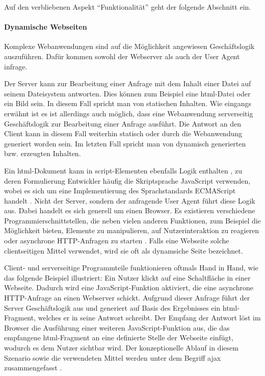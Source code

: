         Auf den verbliebenen Aspekt "`Funktionalität"' geht der folgende Abschnitt ein.

        \paragraph*{Dynamische Webseiten}
        Komplexe Webanwendungen sind auf die Möglichkeit angewiesen Geschäftslogik auszuführen.
        Dafür kommen sowohl der Webserver als auch der User Agent infrage.

        Der Server kann zur Bearbeitung einer Anfrage mit dem Inhalt einer Datei auf seinem Dateisystem antworten.
        Dies können zum Beispiel eine \gls{html}-Datei oder ein Bild sein.
        In diesem Fall spricht man von statischen Inhalten.
        Wie eingangs erwähnt ist es ist allerdings auch möglich,
        dass eine Webanwendung serverseitig Geschäftslogik zur Bearbeitung einer Anfrage ausführt.
        Die Antwort an den Client kann in diesem Fall weiterhin statisch oder
        durch die Webanwendung generiert worden sein.
        Im letzten Fall spricht man von dynamisch generierten bzw. erzeugten Inhalten.

        Ein \gls{html}-Dokument kann in script-Elementen ebenfalls Logik enthalten
        \cite[Kapitel 4.11]{w3c:html5},
        zu deren Formulierung Entwickler häufig die Skriptsprache JavaScript verwenden,
        wobei es sich um eine Implementierung des Sprachstandards ECMAScript handelt
        \cite{ecma:ecmaScript}.
        Nicht der Server, sondern der anfragende User Agent führt diese Logik aus.
        Dabei handelt es sich generell um einen Browser.
        Es existieren verschiedene Programmierschnittstellen,
        die neben vielen anderen Funktionen, zum Beispiel die Möglichkeit bieten,
        Elemente zu manipulieren, auf Nutzerinteraktion zu reagieren
        oder asynchrone HTTP-Anfragen zu starten \cite[Kapitel 8]{whatwg:html}\cite{whatwg:xhr}.
        Falls eine Webseite solche clientseitigen Mittel verwendet,
        wird sie oft als dynamsiche Seite bezeichnet.
        
        Client- und serverseitige Programmteile funktionieren oftmals Hand in Hand,
        wie das folgende Beispiel illustriert:
        Ein Nutzer klickt auf eine Schaltfläche in einer Webseite.
        Dadurch wird eine JavaScript-Funktion aktiviert,
        die eine asynchrone HTTP-Anfrage an einen Webserver schickt.
        Aufgrund dieser Anfrage führt der Server Geschäftslogik aus
        und generiert auf Basis des Ergebnisses ein \gls{html}-Fragment,
        welches er in seine Antwort schreibt.
        Der Empfang der Antwort löst im Browser die Ausführung einer weiteren
        JavaScript-Funktion aus, die das empfangene \gls{html}-Fragment
        an eine definierte Stelle der Webseite einfügt,
        wodurch es dem Nutzer sichtbar wird.
        Der konzeptionelle Ablauf in diesem Szenario sowie die verwendeten Mittel
        werden unter dem Begriff \gls{ajax} zusammengefasst \cite{garrett:ajax}.

